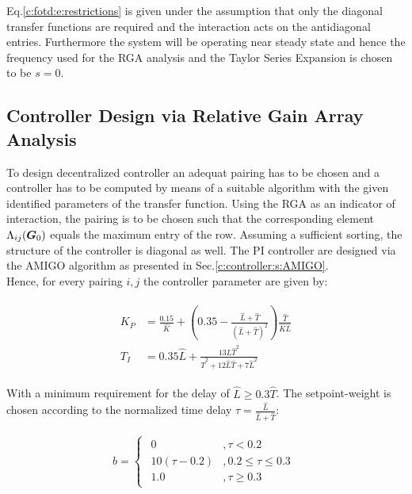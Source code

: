 Eq.\ref{c:fotd:e:restrictions} is given under the assumption that only the diagonal transfer functions are required and the interaction acts on the antidiagonal entries. Furthermore the system will be operating near steady state and hence the frequency used for the RGA analysis and the Taylor Series Expansion is chosen to be $s = 0$.

\subsection{Controller Design via Relative Gain Array Analysis}
\label{c:fotd:su:rga}

To design decentralized controller an adequat pairing has to be chosen and a controller has to be computed by means of a suitable algorithm with the given identified parameters of the transfer function. Using the RGA as an indicator of interaction, the pairing is to be chosen such that the corresponding element $\Lambda_{ij}(\mbox{\boldmath$G$}_0)$ equals the maximum entry of the row. Assuming a sufficient sorting, the structure of the controller is diagonal as well. The PI controller are designed via the AMIGO algorithm as presented in Sec.\ref{c:controller:s:AMIGO}.\\

Hence, for every pairing $i,j$ the controller parameter are given by:

\begin{align*}
\begin{split}
K_P &= \frac{0.15}{\hat{K}}+ \left(0.35 - \frac{\hat{L}+\hat{T}}{(\hat{L}+\hat{T})^2}\right) \frac{\hat{T}}{\hat{K}\hat{L}} \\
T_I &= 0.35 \hat{L} + \frac{13 \hat{L}\hat{T}^2}{\hat{T}^2 + 12 \hat{L}\hat{T} + 7 \hat{L}^2}
\end{split}
\end{align*}

With a minimum requirement for the delay of $\hat{L} \geq 0.3 \hat{T}$. The setpoint-weight is chosen according to the normalized time delay $\tau = \frac{\hat{L}}{\hat{L}+\hat{T}}$:

\begin{align*}
b = \begin{cases}
\begin{split}
0 &, \tau < 0.2 \\
10(\tau-0.2) &, 0.2 \leq \tau \leq 0.3 \\
1.0 &, \tau \geq 0.3
\end{split}
\end{cases}
\end{align*}


